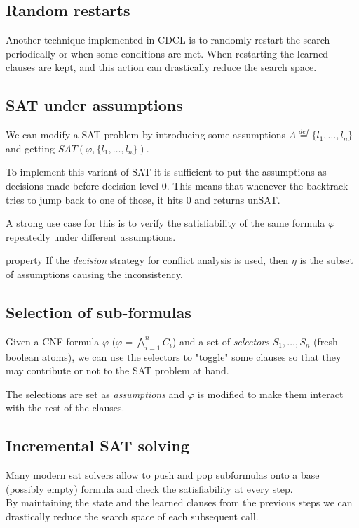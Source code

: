 \documentclass{article}
\begin{document}
\subsection{Random restarts}
Another technique implemented in CDCL is to randomly restart the search periodically or when some conditions are met. When restarting the learned clauses are kept, and this action can drastically reduce the search space.

\subsection{SAT under assumptions}
We can modify a SAT problem by introducing some assumptions $A\overset{def}=\{l_1,\dots,l_n\}$ and getting $SAT(\varphi,\{l_1,\dots,l_n\})$.

To implement this variant of SAT it is sufficient to put the assumptions as decisions made before decision level 0. This means that whenever the backtrack tries to jump back to one of those, it hits 0 and returns unSAT.

A strong use case for this is to verify the satisfiability of the same formula $\varphi$ repeatedly under different assumptions.

\begin{callout}{property}
    If the \textit{decision} strategy for conflict analysis is used, then $\eta$ is the subset of assumptions causing the inconsistency.
\end{callout}

\subsection{Selection of sub-formulas}
Given a CNF formula $\varphi$ ($\varphi = \bigwedge_{i=1}^n C_i$) and a set of \textit{selectors} $S_1,\dots,S_n$ (fresh boolean atoms), we can use the selectors to "toggle" some clauses so that they may contribute or not to the SAT problem at hand.

The selections are set as \textit{assumptions} and $\varphi$ is modified to make them interact with the rest of the clauses.

\subsection{Incremental SAT solving}
Many modern sat solvers allow to push and pop subformulas onto a base (possibly empty) formula and check the satisfiability at every step.\\
By maintaining the state and the learned clauses from the previous steps we can drastically reduce the search space of each subsequent call.
\end{document}

